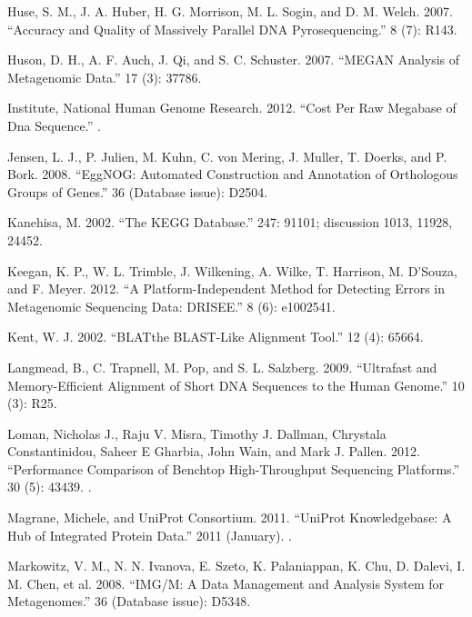 \documentclass[letterpaper,10pt,english]{sphinxmanual}
\begin{document}
Huse, S. M., J. A. Huber, H. G. Morrison, M. L. Sogin, and D. M.
Welch. 2007. “Accuracy and Quality of Massively Parallel DNA
Pyrosequencing.”  8 (7): R143.

Huson, D. H., A. F. Auch, J. Qi, and S. C. Schuster. 2007. “MEGAN
Analysis of Metagenomic Data.”  17 (3): 377\textendash{}86.

Institute, National Human Genome Research. 2012. “Cost Per Raw
Megabase of Dna Sequence.”
.

Jensen, L. J., P. Julien, M. Kuhn, C. von Mering, J. Muller, T.
Doerks, and P. Bork. 2008. “EggNOG: Automated Construction and
Annotation of Orthologous Groups of Genes.”  36
(Database issue): D250\textendash{}4.

Kanehisa, M. 2002. “The KEGG Database.”  247:
91\textendash{}101; discussion 101\textendash{}3, 119\textendash{}28, 244\textendash{}52.

Keegan, K. P., W. L. Trimble, J. Wilkening, A. Wilke, T. Harrison,
M. D’Souza, and F. Meyer. 2012. “A Platform-Independent Method for
Detecting Errors in Metagenomic Sequencing Data: DRISEE.”  8 (6): e1002541.

Kent, W. J. 2002. “BLAT\textendash{}the BLAST-Like Alignment Tool.”  12 (4): 656\textendash{}64.

Langmead, B., C. Trapnell, M. Pop, and S. L. Salzberg. 2009.
“Ultrafast and Memory-Efficient Alignment of Short DNA Sequences
to the Human Genome.”  10 (3): R25.

Loman, Nicholas J., Raju V. Misra, Timothy J. Dallman, Chrystala
Constantinidou, Saheer E Gharbia, John Wain, and Mark J. Pallen.
2012. “Performance Comparison of Benchtop High-Throughput
Sequencing Platforms.”  30 (5): 434\textendash{}39.
.

Magrane, Michele, and UniProt Consortium. 2011. “UniProt
Knowledgebase: A Hub of Integrated Protein Data.”  2011 (January).
.

Markowitz, V. M., N. N. Ivanova, E. Szeto, K. Palaniappan, K. Chu,
D. Dalevi, I. M. Chen, et al. 2008. “IMG/M: A Data Management and
Analysis System for Metagenomes.”  36 (Database
issue): D534\textendash{}8.
\end{document}
